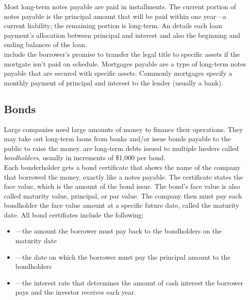 \documentclass{article}
\begin{document}
Most long-term notes payable are paid in installments. The current portion of notes payable is the principal amount that will be paid within one year---a current liability; the remaining portion is long-term. An  details each loan payment's allocation between principal and interest and also the beginning and ending balances of the loan. \\ 

 include the borrower's promise to transfer the legal title to specific assets if the mortgate isn't paid on schedule. Mortgages payable are a type of long-term notes payable that are secured with specific assets. Commonly mortgages specify a monthly payment of principal and interest to the lender (usually a bank).  

\subsection{Bonds}

Large companies need large amounts of money to finance their operations. They may take out long-term laons from banks and/or issue bonds payable to the public to raise the money.  are long-term debts issued to multiple lneders called \emph{bondholders}, usually in increments of \$1,000 per bond. \\ 

Each bonderholder gets a bond certificate that shows the name of the company that borrowed the money, exactly like a notes payable. The certificate states the face value, which is the amount of the bond issue. The bond's face value is also called maturity value, principal, or par value. The company then must pay each bondholder the face value amount at a specific future date, called the maturity date. All bond certifiates include the following: 
\begin{itemize}
  \item {}---the amount the borrower must pay back to the bondholders on the maturity date 
  \item {}---the date on which the borrower must pay the principal amount to the bondholders 
  \item {}---the interest rate that determines the amount of cash interest the borrower pays and the investor receives each year. 
\end{itemize}
\end{document}
